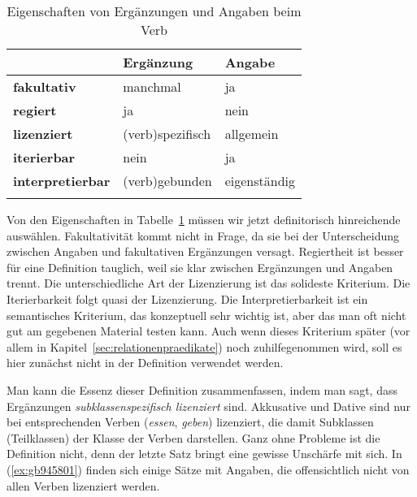 \begin{table}
  \centering
  \begin{tabular}{lll}
    \lsptoprule
    & \textbf{Ergänzung} & \textbf{Angabe} \\
    \midrule
    \textbf{fakultativ} & manchmal & ja \\
    \textbf{regiert} & ja & nein \\
    \textbf{lizenziert} & (verb)spezifisch & allgemein \\
    \textbf{iterierbar} & nein & ja \\
    \textbf{interpretierbar} & (verb)gebunden & eigenständig \\
    \lspbottomrule
  \end{tabular}
  \caption{Eigenschaften von Ergänzungen und Angaben beim Verb}
  \label{tab:ergang}
\end{table}

Von den Eigenschaften in Tabelle~\ref{tab:ergang} müssen wir jetzt definitorisch hinreichende auswählen.
Fakultativität kommt nicht in Frage, da sie bei der Unterscheidung zwischen Angaben und fakultativen Ergänzungen versagt.
Regiertheit ist besser für eine Definition tauglich, weil sie klar zwischen Ergänzungen und Angaben trennt.
Die unterschiedliche Art der Lizenzierung ist das solideste Kriterium.
Die Iterierbarkeit folgt quasi der Lizenzierung.
Die Interpretierbarkeit ist ein semantisches Kriterium, das konzeptuell sehr wichtig ist, aber das man oft nicht gut am gegebenen Material testen kann.
Auch wenn dieses Kriterium später (vor allem in Kapitel~\ref{sec:relationenpraedikate}) noch zuhilfegenommen wird, soll es hier zunächst nicht in der Definition verwendet werden.


Man kann die Essenz dieser Definition zusammenfassen, indem man sagt, dass Ergänzungen \textit{subklassenspezifisch lizenziert} sind.
Akkusative und Dative sind \zB nur bei entsprechenden Verben (\zB \textit{essen}, \textit{geben}) lizenziert, die damit Subklassen (Teilklassen) der Klasse der Verben darstellen.
Ganz ohne Probleme ist die Definition nicht, denn der letzte Satz bringt eine gewisse Unschärfe mit sich.
In (\ref{ex:gb945801}) finden sich einige Sätze mit Angaben, die offensichtlich nicht von allen Verben lizenziert werden.

